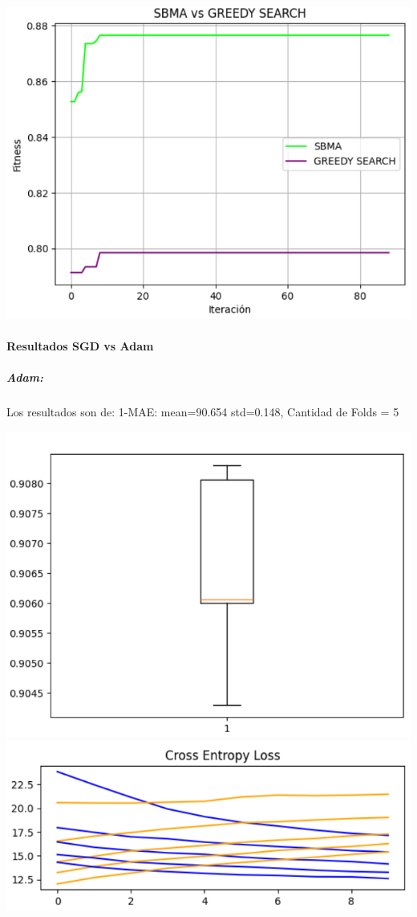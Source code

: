 \begin{center}
\includegraphics[scale=0.3]{Imagenes/Imagen.png}    
\end{center}

\paragraph{Resultados SGD vs Adam}
\subparagraph{Adam: }
Los resultados son de: 1-MAE: mean=90.654 std=0.148, Cantidad de Folds = 5

\begin{center}
\includegraphics[scale=0.3]{Imagenes/uuh.png}
\includegraphics[scale=0.3]{Imagenes/image2.png}    
\end{center}

